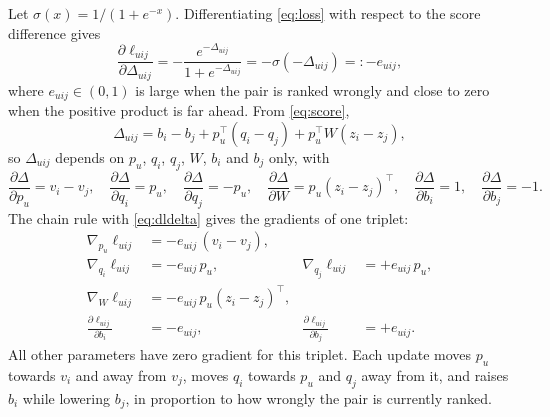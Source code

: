 \documentclass[12pt,a4paper]{article}
\begin{document}
Let $\sigma(x) = 1/(1 + e^{-x})$. Differentiating \eqref{eq:loss} with respect
to the score difference gives
\begin{equation}
    \frac{\partial \ell_{uij}}{\partial \Delta_{uij}}
    = -\frac{e^{-\Delta_{uij}}}{1 + e^{-\Delta_{uij}}}
    = -\sigma(-\Delta_{uij}) =: -e_{uij},
    \label{eq:dldelta}
\end{equation}
where $e_{uij} \in (0, 1)$ is large when the pair is ranked wrongly and close
to zero when the positive product is far ahead. From \eqref{eq:score},
\[
    \Delta_{uij} = b_i - b_j + p_u^\top (q_i - q_j) + p_u^\top W (z_i - z_j),
\]
so $\Delta_{uij}$ depends on $p_u$, $q_i$, $q_j$, $W$, $b_i$ and $b_j$ only,
with
\[
    \frac{\partial \Delta}{\partial p_u} = v_i - v_j, \quad
    \frac{\partial \Delta}{\partial q_i} = p_u, \quad
    \frac{\partial \Delta}{\partial q_j} = -p_u, \quad
    \frac{\partial \Delta}{\partial W} = p_u (z_i - z_j)^\top, \quad
    \frac{\partial \Delta}{\partial b_i} = 1, \quad
    \frac{\partial \Delta}{\partial b_j} = -1 .
\]
The chain rule with \eqref{eq:dldelta} gives the gradients of one triplet:
\begin{align}
    \nabla_{p_u} \ell_{uij} &= -e_{uij}\,(v_i - v_j), \label{eq:gp}\\
    \nabla_{q_i} \ell_{uij} &= -e_{uij}\,p_u, &
    \nabla_{q_j} \ell_{uij} &= +e_{uij}\,p_u, \label{eq:gq}\\
    \nabla_{W} \ell_{uij} &= -e_{uij}\,p_u (z_i - z_j)^\top, \label{eq:gw}\\
    \frac{\partial \ell_{uij}}{\partial b_i} &= -e_{uij}, &
    \frac{\partial \ell_{uij}}{\partial b_j} &= +e_{uij}. \label{eq:gb}
\end{align}
All other parameters have zero gradient for this triplet. Each update moves
$p_u$ towards $v_i$ and away from $v_j$, moves $q_i$ towards $p_u$ and $q_j$
away from it, and raises $b_i$ while lowering $b_j$, in proportion to how
wrongly the pair is currently ranked.
\end{document}
